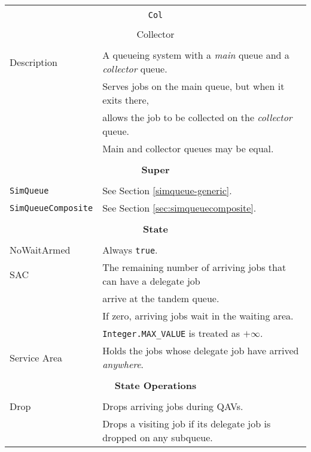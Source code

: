 \begin{tabular}{|l|l|}
	\hline
	\multicolumn{2}{|c|}{} \\
	\multicolumn{2}{|c|}{\lstinline[basicstyle=\large]{Col}} \\
	\multicolumn{2}{|c|}{} \\
	\multicolumn{2}{|c|}{Collector} \\
	\multicolumn{2}{|c|}{} \\
	\hline
	Description & A queueing system with a {\em main\/} queue
	              and a {\em collector\/} queue.  \\
	            &
	              Serves jobs on the main queue, but when it exits there, \\
	            & allows the job to be collected on the {\em collector\/} queue.\\
	            & Main and collector queues may be equal. \\
	\hline
	\multicolumn{2}{|c|}{} \\
	\multicolumn{2}{|c|}{\bf Super} \\
	\multicolumn{2}{|c|}{} \\
	\hline
	\lstinline|SimQueue| & See Section \ref{simqueue-generic}. \\
	\lstinline|SimQueueComposite| & See Section \ref{sec:simqueuecomposite}. \\
	\hline
	\multicolumn{2}{|c|}{} \\
	\multicolumn{2}{|c|}{\bf State} \\
	\multicolumn{2}{|c|}{} \\
	\hline
	NoWaitArmed & Always \lstinline|true|. \\
	\hline
	SAC & The remaining number of arriving jobs that can have a delegate job \\
	& arrive at the tandem queue. \\
	& If zero, arriving jobs wait in the waiting area. \\
	& \lstinline|Integer.MAX_VALUE| is treated as $+\infty$. \\
	\hline
	Service Area & Holds the jobs whose delegate job have arrived {\em anywhere}. \\
	\hline
	\multicolumn{2}{|c|}{} \\
	\multicolumn{2}{|c|}{\bf State Operations} \\
	\multicolumn{2}{|c|}{} \\
	\hline
	Drop & Drops arriving jobs during QAVs. \\
	& Drops a visiting job if its delegate job is dropped on any subqueue. \\

\end{tabular}
